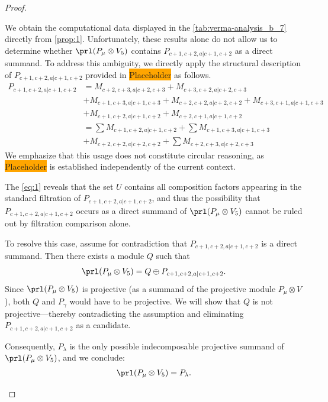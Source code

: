 \begin{proof}
\begin{enumerate}
\begin{enumerate}
We obtain the computational data displayed in the \cref{tab:verma-analysis_b_7} directly from \cref{prop:1}. 
Unfortunately, these results alone do not allow us to determine whether $\prl(P_\mu \otimes V_5)$ contains $P_{c+1,c+2,a|c+1,c+2}$ as a direct summand. To address this ambiguity, we directly apply the structural description of $P_{c+1,c+2,a|c+1,c+2}$ provided in \colorbox{orange}{Placeholder} as follows.
\begin{equation}\label{eq:2}
  \begin{aligned}
    P_{c+1,c+2,a|c+1,c+2} &=
M_{c+2,c+3,a|c+2,c+3}
+M_{c+3,c+2,a|c+2,c+3}\\
                                              &
+M_{c+1,c+3,a|c+1,c+3}
+M_{c+2,c+2,a|c+2,c+2}
+M_{c+3,c+1,a|c+1,c+3}\\
                                              &
+M_{c+1,c+2,a|c+1,c+2}
+M_{c+2,c+1,a|c+1,c+2} \\
                          &=
\sum M_{c+1,c+2,a|c+1,c+2}
+\sum M_{c+1,c+3,a|c+1,c+3}\\
                                              &
+ M_{c+2,c+2,a|c+2,c+2}
+\sum M_{c+2,c+3,a|c+2,c+3}
  \end{aligned}
\end{equation}
We emphasize that this usage does not constitute circular reasoning, as \colorbox{orange}{Placeholder} is established independently of the current context.

The \cref{eq:1} reveals that the set $U$ contains all composition factors appearing in the standard filtration of $P_{c+1,c+2,a|c+1,c+2}$, and thus the possibility that $P_{c+1,c+2,a|c+1,c+2}$ occurs as a direct summand of $\prl(P_\mu \otimes V_5)$ cannot be ruled out by filtration comparison alone.

To resolve this case, assume for contradiction that $P_{c+1,c+2,a|c+1,c+2}$ is a direct summand. Then there exists a module $Q$ such that
\begin{equation}\notag
  \begin{aligned}
    \prl(P_\mu \otimes V_5) = Q \oplus P_{c+1,c+2,a|c+1,c+2}.
  \end{aligned}
\end{equation}
Since $\prl(P_\mu \otimes V_5)$ is projective (as a summand of the projective module $P_\mu \otimes V$), both $Q$ and $P_\gamma$ would have to be projective. We will show that $Q$ is not projective—thereby contradicting the assumption and eliminating $P_{c+1,c+2,a|c+1,c+2}$ as a candidate.

Consequently, $P_\lambda$ is the only possible indecomposable projective summand of $\prl(P_\mu \otimes V_5)$, and we conclude:
\begin{equation}\notag
  \begin{aligned}
\prl(P_\mu \otimes V_5) = P_\lambda.
  \end{aligned}
\end{equation}


\end{enumerate}
\end{enumerate}
\end{proof}
